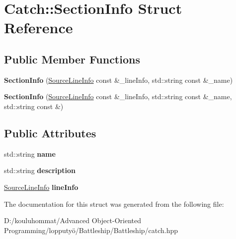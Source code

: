 \hypertarget{struct_catch_1_1_section_info}{}\section{Catch\+:\+:Section\+Info Struct Reference}
\label{struct_catch_1_1_section_info}
\subsection*{Public Member Functions}
\begin{DoxyCompactItemize}
\item 
\mbox{\label{struct_catch_1_1_section_info_a2808437ae7d4bc0830cee1c3995165a6}} 
{\bfseries Section\+Info} (\mbox{\hyperlink{struct_catch_1_1_source_line_info}{Source\+Line\+Info}} const \&\+\_\+line\+Info, std\+::string const \&\+\_\+name)
\item 
\mbox{\label{struct_catch_1_1_section_info_a139875f2e7bd12a5898a948f8bad15b3}} 
{\bfseries Section\+Info} (\mbox{\hyperlink{struct_catch_1_1_source_line_info}{Source\+Line\+Info}} const \&\+\_\+line\+Info, std\+::string const \&\+\_\+name, std\+::string const \&)
\end{DoxyCompactItemize}
\subsection*{Public Attributes}
\begin{DoxyCompactItemize}
\item 
\mbox{\label{struct_catch_1_1_section_info_a704c8fc662d309137e0d4f199cb7df58}} 
std\+::string {\bfseries name}
\item 
\mbox{\label{struct_catch_1_1_section_info_a0052060219a6de74bb7ade34d4163a4e}} 
std\+::string {\bfseries description}
\item 
\mbox{\label{struct_catch_1_1_section_info_adbc83b8a3507c4acc8ee249e93465711}} 
\mbox{\hyperlink{struct_catch_1_1_source_line_info}{Source\+Line\+Info}} {\bfseries line\+Info}
\end{DoxyCompactItemize}


The documentation for this struct was generated from the following file\+:\begin{DoxyCompactItemize}
\item 
D\+:/kouluhommat/\+Advanced Object-\/\+Oriented Programming/lopputyö/\+Battleship/\+Battleship/catch.\+hpp\end{DoxyCompactItemize}
